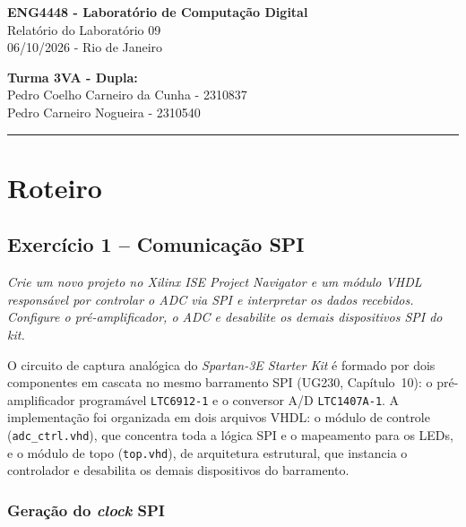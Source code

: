 \documentclass[12pt,a4paper]{article}
\newcommand{\question}[1]{
    \vspace{0.8em}
    \noindent\textit{#1}
    \vspace{0.4em}
}
\newcommand{\answer}{
    \par
}
\begin{document}
\begin{center}
    {\LARGE \textbf{ENG4448 - Laboratório de Computação Digital}}\\[0.3cm]
    {\Large Relatório do Laboratório 09}\\[0.2cm]
    06/10/2026 - Rio de Janeiro
\end{center}

\vspace{0.8cm}

\noindent \textbf{Turma 3VA - Dupla:}\\
Pedro Coelho Carneiro da Cunha - 2310837\\
Pedro Carneiro Nogueira - 2310540

\vspace{0.5cm}
\hrule
\vspace{0.8cm}

\setcounter{section}{1}
\setcounter{subsection}{0}

\section{Roteiro}

\subsection{Exercício 1 – Comunicação SPI}

\question{Crie um novo projeto no Xilinx ISE Project Navigator e um módulo VHDL responsável
por controlar o ADC via SPI e interpretar os dados recebidos. Configure o pré-amplificador,
o ADC e desabilite os demais dispositivos SPI do kit.}

\answer
O circuito de captura analógica do \textit{Spartan-3E Starter Kit} é formado por dois
componentes em cascata no mesmo barramento SPI (UG230, Capítulo~10): o pré-amplificador
programável \texttt{LTC6912-1} e o conversor A/D \texttt{LTC1407A-1}. A implementação foi
organizada em dois arquivos VHDL: o módulo de controle (\texttt{adc\_ctrl.vhd}), que
concentra toda a lógica SPI e o mapeamento para os LEDs, e o módulo de topo
(\texttt{top.vhd}), de arquitetura estrutural, que instancia o controlador e desabilita os
demais dispositivos do barramento.

\subsubsection{Geração do \textit{clock} SPI}
\end{document}
